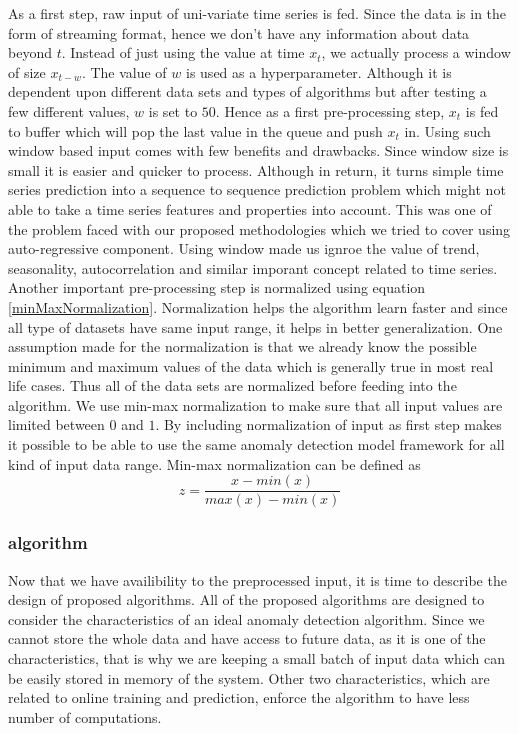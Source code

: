 \documentclass[12pt]{article}
\begin{document}
As a first step, raw input of uni-variate time series is fed. Since the data is in the form of streaming format, hence we don't have any information about data beyond $t$. Instead of just using the value at time $x_t$, we actually process a window of size $x_{t-w}$. The value of $w$ is used as a hyperparameter. Although it is dependent upon different data sets and types of algorithms but after testing a few different values, $w$ is set to $50$. Hence as a first pre-processing step, $x_t$ is fed to buffer which will pop the last value in the queue and push $x_t$ in. Using such window based input comes with few benefits and drawbacks. Since window size is small it is easier and quicker to process. Although in return, it turns simple time series prediction into a sequence to sequence prediction problem which might not able to take a time series features and properties into account. This was one of the problem faced with our proposed methodologies which we tried to cover using auto-regressive component. Using window made us ignroe the value of trend, seasonality, autocorrelation and similar imporant concept related to time series.\\
\break
Another important pre-processing step is normalized using equation \ref{minMaxNormalization}. Normalization helps the algorithm learn faster and since all type of datasets have same input range, it helps in better generalization. One assumption made for the normalization is that we already know the possible minimum and maximum values of the data which is generally true in most real life cases. Thus all of the data sets are normalized before feeding into the algorithm.
We use min-max normalization to make sure that all input values are limited between $0$ and $1$. By including normalization of input as first step makes it possible to be able to use the same anomaly detection model framework for all kind of input data range. Min-max normalization can be defined as
\begin{equation}
    z = \frac{x - min(x)}{max(x) - min(x)}
    \label{minMaxNormalization}
\end{equation}
\subsubsection{algorithm}
Now that we have availibility to the preprocessed input, it is time to describe the design of proposed algorithms. All of the proposed algorithms are designed to consider the characteristics of an ideal anomaly detection algorithm. Since we cannot store the whole data and have access to future data, as it is one of the characteristics, that is why we are keeping a small batch of input data which can be easily stored in memory of the system. Other two characteristics, which are related to online training and prediction, enforce the algorithm to have less number of computations.\\
\break
\end{document}
